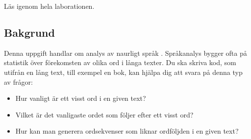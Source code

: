 


\Lab{\LabWeekSEVEN}
\begin{Goals}

\end{Goals}

\begin{Preparations}
\item {} 
\item Läs igenom hela laborationen.
\end{Preparations}


\subsection{Bakgrund}

Denna uppgift handlar om analys av naurligt språk . Språkanalys bygger ofta på statistik över förekomsten av olika ord i långa texter. Du ska skriva kod, som utifrån en lång text, till exempel en bok, kan hjälpa dig att svara på denna typ av frågor: 
\begin{itemize} 
\item Hur vanligt är ett visst ord i en given text?
\item Vilket är det vanligaste ordet som följer efter ett visst ord?
\item Hur kan man generera ordsekvenser som liknar ordföljden i en given text?
\end{itemize}

